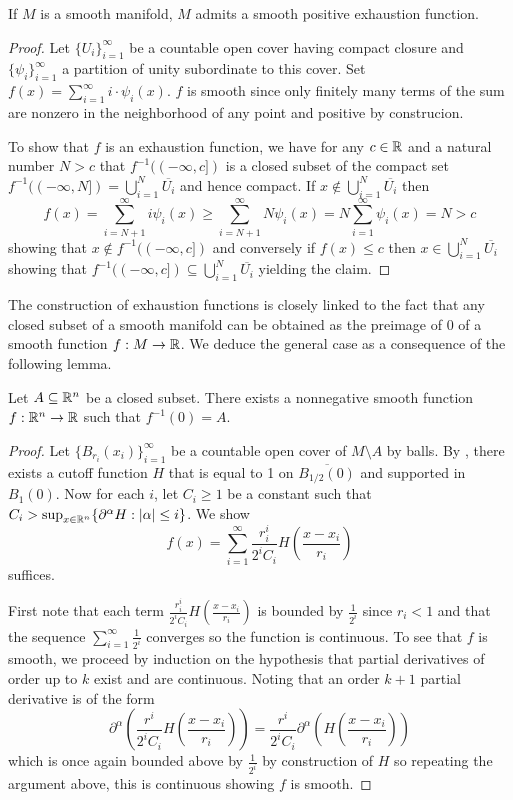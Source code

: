 \begin{proposition}\label{prop: existence of smooth exhaustion function}
    If $M$ is a smooth manifold, $M$ admits a smooth positive exhaustion function. 
\end{proposition}
\begin{proof}
    Let $\{U_{i}\}_{i=1}^{\infty}$ be a countable open cover having compact closure and $\{\psi_{i}\}_{i=1}^{\infty}$ a partition of unity subordinate to this cover. Set $f(x)=\sum_{i=1}^{\infty}i\cdot\psi_{i}(x)$. $f$ is smooth since only finitely many terms of the sum are nonzero in the neighborhood of any point and positive by construcion. 

    To show that $f$ is an exhaustion function, we have for any $c\in\mathbb{R}$ and a natural number $N>c$ that $f^{-1}((-\infty,c])$ is a closed subset of the compact set $f^{-1}((-\infty,N])=\bigcup_{i=1}^{N}\overline{U_{i}}$ and hence compact. If $x\notin\bigcup_{i=1}^{N}\overline{U_{i}}$ then 
    $$f(x)=\sum_{i=N+1}^{\infty}i\psi_{i}(x)\geq\sum_{i=N+1}^{\infty}N\psi_{i}(x)=N\sum_{i=1}^{\infty}\psi_{i}(x)=N>c$$
    showing that $x\notin f^{-1}((-\infty,c])$ and conversely if $f(x)\leq c$ then $x\in\bigcup_{i=1}^{N}\overline{U_{i}}$ showing that $f^{-1}((-\infty,c])\subseteq \bigcup_{i=1}^{N}\overline{U_{i}}$ yielding the claim.  
\end{proof}
The construction of exhaustion functions is closely linked to the fact that any closed subset of a smooth manifold can be obtained as the preimage of 0 of a smooth function $f:M\to\mathbb{R}$. We deduce the general case as a consequence of the following lemma. 
\begin{lemma}\label{lem: closed subset is level set of Rn}
    Let $A\subseteq\mathbb{R}^{n}$ be a closed subset. There exists a nonnegative smooth function $f:\mathbb{R}^{n}\to\mathbb{R}$ such that $f^{-1}(0)=A$. 
\end{lemma}
\begin{proof}
    Let $\{B_{r_{i}}(x_{i})\}_{i=1}^{\infty}$ be a countable open cover of $M\setminus A$ by balls. By , there exists a cutoff function $H$ that is equal to 1 on $\overline{B_{1/2}(0)}$ and supported in $B_{1}(0)$.  Now for each $i$, let $C_{i}\geq 1$ be a constant such that $C_{i}>\sup_{x\in\mathbb{R}^{n}}\{\partial^{\alpha}H:|\alpha|\leq i\}$. We show
    $$f(x)=\sum_{i=1}^{\infty}\frac{r_{i}^{i}}{2^{i}C_{i}}H\left(\frac{x-x_{i}}{r_{i}}\right)$$
    suffices. 

    First note that each term $\frac{r_{i}^{i}}{2^{i}C_{i}}H\left(\frac{x-x_{i}}{r_{i}}\right)$ is bounded by $\frac{1}{2^{i}}$ since $r_{i}<1$ and that the sequence $\sum_{i=1}^{\infty}\frac{1}{2^{i}}$ converges so the function is continuous. To see that $f$ is smooth, we proceed by induction on the hypothesis that partial derivatives of order up to $k$ exist and are continuous. Noting that an order $k+1$ partial derivative is of the form 
    $$\partial^{\alpha}\left(\frac{r^{i}}{2^{i}C_{i}}H\left(\frac{x-x_{i}}{r_{i}}\right)\right)=\frac{r^{i}}{2^{i}C_{i}}\partial^{\alpha}\left(H\left(\frac{x-x_{i}}{r_{i}}\right)\right)$$
    which is once again bounded above by $\frac{1}{2^{i}}$ by construction of $H$ so repeating the argument above, this is continuous showing $f$ is smooth. 
\end{proof}
